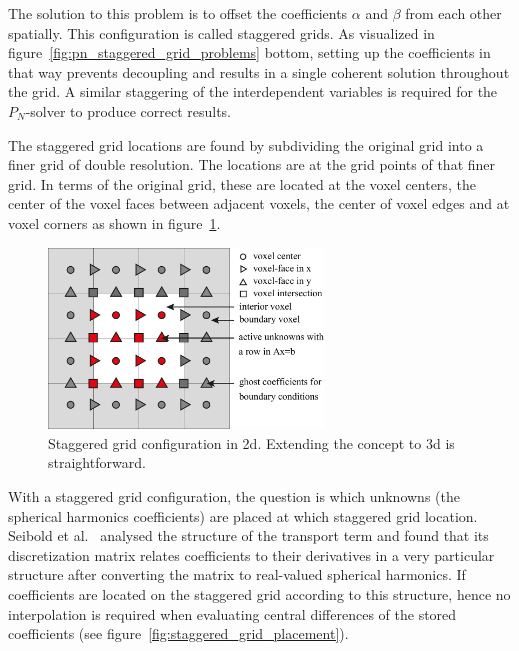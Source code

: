The solution to this problem is to offset the coefficients $\alpha$ and $\beta$ from each other spatially. This configuration is called staggered grids. As visualized in figure~\ref{fig:pn_staggered_grid_problems} bottom, setting up the coefficients in that way prevents decoupling and results in a single coherent solution throughout the grid. A similar staggering of the interdependent variables is required for the $P_N$-solver to produce correct results.

The staggered grid locations are found by subdividing the original grid into a finer grid of double resolution. The locations are at the grid points of that finer grid. In terms of the original grid, these are located at the voxel centers, the center of the voxel faces between adjacent voxels, the center of voxel edges and at voxel corners as shown in figure~\ref{fig:staggered_grid}.
\begin{figure}[h]
\centering
\includegraphics[width=0.65\textwidth]{04_pn_method/figures/fig_staggered_grid.pdf}
\caption{Staggered grid configuration in 2d. Extending the concept to 3d is straightforward.}
\label{fig:staggered_grid}
\end{figure}

With a staggered grid configuration, the question is which unknowns (the spherical harmonics coefficients) are placed at which staggered grid location. Seibold et al.~\cite{Seibold14} analysed the structure of the transport term and found that its discretization matrix relates coefficients to their derivatives in a very particular structure after converting the matrix to real-valued spherical harmonics. If coefficients are located on the staggered grid according to this structure, hence no interpolation is required when evaluating central differences of the stored coefficients (see figure~\ref{fig:staggered_grid_placement}).

